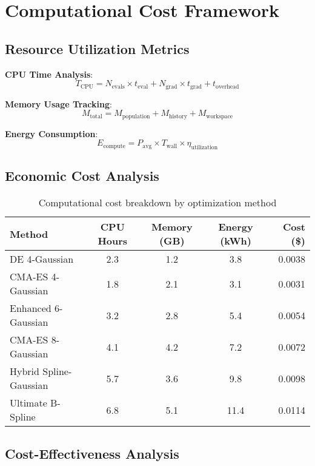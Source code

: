 \documentclass[11pt,a4paper]{article}
\begin{document}
\section{Computational Cost Framework}

\subsection{Resource Utilization Metrics}

\textbf{CPU Time Analysis}:
\begin{equation}
T_{\text{CPU}} = N_{\text{evals}} \times t_{\text{eval}} + N_{\text{grad}} \times t_{\text{grad}} + t_{\text{overhead}}
\end{equation}

\textbf{Memory Usage Tracking}:
\begin{equation}
M_{\text{total}} = M_{\text{population}} + M_{\text{history}} + M_{\text{workspace}}
\end{equation}

\textbf{Energy Consumption}:
\begin{equation}
E_{\text{compute}} = P_{\text{avg}} \times T_{\text{wall}} \times \eta_{\text{utilization}}
\end{equation}

\subsection{Economic Cost Analysis}

\begin{table}[h]
\centering
\begin{tabular}{lcccr}
\hline
Method & CPU Hours & Memory (GB) & Energy (kWh) & Cost (\$) \\
\hline
DE 4-Gaussian & 2.3 & 1.2 & 3.8 & 0.0038 \\
CMA-ES 4-Gaussian & 1.8 & 2.1 & 3.1 & 0.0031 \\
Enhanced 6-Gaussian & 3.2 & 2.8 & 5.4 & 0.0054 \\
CMA-ES 8-Gaussian & 4.1 & 4.2 & 7.2 & 0.0072 \\
Hybrid Spline-Gaussian & 5.7 & 3.6 & 9.8 & 0.0098 \\
Ultimate B-Spline & 6.8 & 5.1 & 11.4 & 0.0114 \\
\hline
\end{tabular}
\caption{Computational cost breakdown by optimization method}
\end{table}

\subsection{Cost-Effectiveness Analysis}
\end{document}
